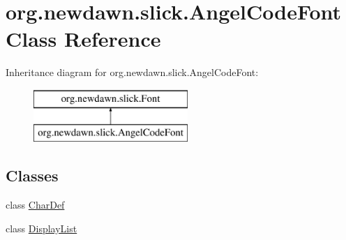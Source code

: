 \hypertarget{classorg_1_1newdawn_1_1slick_1_1_angel_code_font}{}\section{org.\+newdawn.\+slick.\+Angel\+Code\+Font Class Reference}
\label{classorg_1_1newdawn_1_1slick_1_1_angel_code_font}
Inheritance diagram for org.\+newdawn.\+slick.\+Angel\+Code\+Font\+:\begin{figure}[H]
\begin{center}
\leavevmode
\includegraphics[height=2.000000cm]{classorg_1_1newdawn_1_1slick_1_1_angel_code_font}
\end{center}
\end{figure}
\subsection*{Classes}
\begin{DoxyCompactItemize}
\item 
class \mbox{\hyperlink{classorg_1_1newdawn_1_1slick_1_1_angel_code_font_1_1_char_def}{Char\+Def}}
\item 
class \mbox{\hyperlink{classorg_1_1newdawn_1_1slick_1_1_angel_code_font_1_1_display_list}{Display\+List}}
\end{DoxyCompactItemize}
